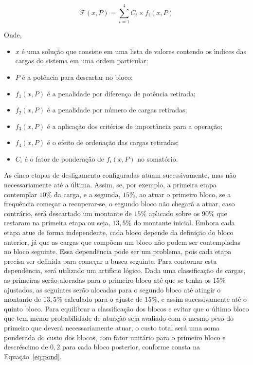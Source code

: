 \begin{equation} \label{eq:objsimp}
	\mathcal{F}\left( x, P \right) = \sum_{i=1}^{4}{C_{i} \times f_{i} \left( x, P \right)}
\end{equation}

Onde,

\begin{itemize}
	\item[] $ x $ {\'e} uma solu{\c c}{\~a}o que consiste em uma lista de valores contendo os {\'\i}ndices das cargas do sistema em uma ordem particular;
	\item[] $ P $ {\'e} a pot{\^e}ncia para descartar no bloco;
	\item[] $ f_{1}\left(x, P \right) $ {\'e} a penalidade por diferen{\c c}a de pot{\^e}ncia retirada;
	\item[] $ f_{2}\left(x, P \right) $ {\'e} a penalidade por n{\'u}mero de cargas retiradas;
	\item[] $ f_{3}\left(x, P \right) $ {\'e} a aplica{\c c}{\~a}o dos crit{\'e}rios de import{\^a}ncia para a opera{\c c}{\~a}o;
	\item[] $ f_{4}\left(x, P \right) $ {\'e} o efeito de ordena{\c c}{\~a}o das cargas retiradas;
	\item[] $ C_{i} $ {\'e} o fator de pondera{\c c}{\~a}o de $ f_{i}\left(x, P \right) $ no somat{\'o}rio.
\end{itemize}

As cinco etapas de desligamento configuradas atuam sucessivamente, mas n{\~a}o necessariamente at{\'e} a {\'u}ltima. Assim, se, por exemplo, a primeira etapa contemplar $10\%$ da carga, e a segunda, $15\%$, ao atuar o primeiro bloco, se a frequ{\^e}ncia come{\c c}ar a recuperar-se, o segundo bloco n{\~a}o chegar{\'a} a atuar, caso contr{\'a}rio, ser{\'a} descartado um montante de $15\%$ aplicado sobre os $90\%$ que restaram na primeira etapa ou seja, $13,5\%$ do montante inicial. Embora cada etapa atue de forma independente, cada bloco depende da defini{\c c}{\~a}o do bloco anterior, j{\'a} que as cargas que comp{\~o}em um bloco n{\~a}o podem ser contempladas no bloco seguinte. Essa depend{\^e}ncia pode ser um problema, pois cada etapa precisa ser definida para come{\c c}ar a busca seguinte. Para contornar esta depend{\^e}ncia, ser{\'a} utilizado um artif{\'\i}cio l{\'o}gico. Dada uma classifica{\c c}{\~a}o de cargas, as primeiras ser{\~a}o alocadas para o primeiro bloco at{\'e} que se tenha os $15\%$ ajustados, as seguintes ser{\~a}o alocadas para o segundo bloco at{\'e} atingir o montante de $13,5\%$ calculado para o ajuste de $15\%$, e assim sucessivamente at{\'e} o quinto bloco. Para equilibrar a classifica{\c c}{\~a}o dos blocos e evitar que o {\'u}ltimo bloco que tem menor probabilidade de atua{\c c}{\~a}o seja avaliado com o mesmo peso do primeiro que dever{\'a} necessariamente atuar, o custo total ser{\'a} uma soma ponderada do custo dos blocos, com fator unit{\'a}rio para o primeiro bloco e descr{\'e}scimo de $0,2$ para cada bloco posterior, conforme consta na Equa{\c c}{\~a}o~\ref{eq:pond}.

